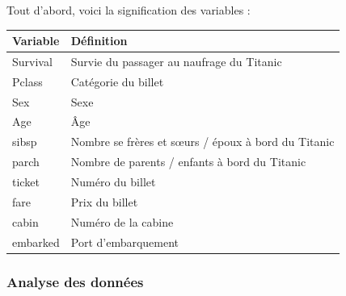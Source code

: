 \documentclass[11pt,french]{report}
\begin{document}
Tout d'abord, voici la signification des variables :
\begin{center}
\begin{tabularx}{\textwidth}{XX}
\hline
Variable & Définition \\
\hline
Survival & Survie du passager au naufrage du Titanic \\
Pclass & Catégorie du billet \\
Sex & Sexe \\
Age & Âge \\
sibsp & Nombre se frères et sœurs / époux à bord du Titanic \\
parch & Nombre de parents / enfants à bord du Titanic \\
ticket & Numéro du billet \\
fare & Prix du billet \\
cabin & Numéro de la cabine \\
embarked & Port d'embarquement \\
\hline
\end{tabularx}
\end{center}
\subsubsection{Analyse des données}
\end{document}

